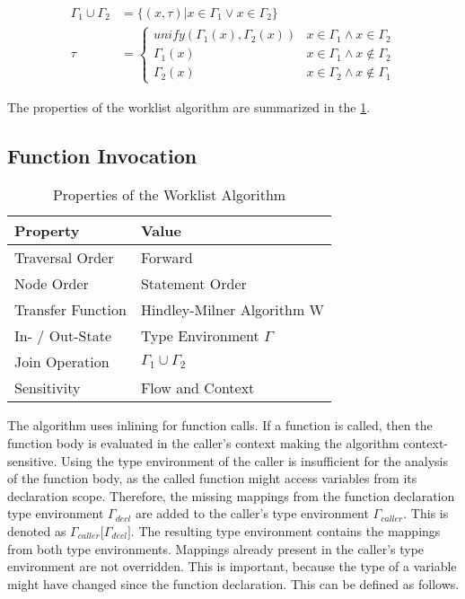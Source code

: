 \begin{align*}
	\Gamma_1 \cup \Gamma_2 &= \lbrace (x, \tau) \vert x \in \Gamma_1 \vee x \in \Gamma_2 \rbrace \\
	\tau &= \begin{cases}
		unify(\Gamma_1(x), \Gamma_2(x)) & x \in \Gamma_1 \wedge x \in \Gamma_2 \\
		\Gamma_1(x) & x \in \Gamma_1 \wedge x \notin \Gamma_2 \\
		\Gamma_2(x) & x \in \Gamma_2\wedge x \notin \Gamma_1
	\end{cases}
\end{align*}

The properties of the worklist algorithm are summarized in the \cref{tbl:properties-worklist-algorithm}. 

\subsection{Function Invocation}

\begin{table}
	\centering
	\begin{tabular}{@{}l l@{}}\toprule
	Property & Value \\ \midrule
	Traversal Order & Forward \\
	Node Order & Statement Order \\
	Transfer Function & Hindley-Milner Algorithm W \\
	In- / Out-State & Type Environment $\Gamma$ \\
	Join Operation & $\Gamma_1 \cup \Gamma_2$ \\
	Sensitivity & Flow and Context \\ \bottomrule
	\end{tabular}
	
	\caption{Properties of the Worklist Algorithm}
	\label{tbl:properties-worklist-algorithm}
\end{table}

The algorithm uses inlining for function calls. If a function is called, then the function body is evaluated in the caller's context making the algorithm context-sensitive. Using the type environment of the caller is insufficient for the analysis of the function body, as the called function might access variables from its declaration scope. Therefore, the missing mappings from the function declaration type environment $\Gamma_{decl}$ are added to the caller's type environment $\Gamma_{caller}$. This is denoted as $\Gamma_{caller}\Big\lbrack\Gamma_{decl}\Big\rbrack$. The resulting type environment contains the mappings from both type environments. Mappings already present in the caller's type environment are not overridden. This is important, because the type of a variable might have changed since the function declaration. This can be defined as follows.

